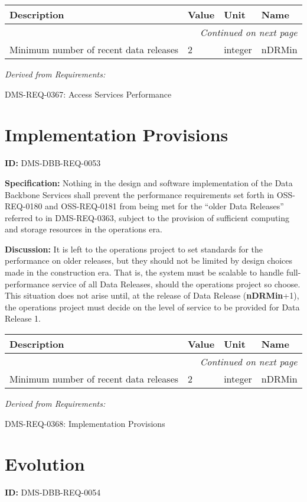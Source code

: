 \documentclass[SE,toc,lsstdraft]{lsstdoc}
\makeatletter
\newcommand{\paramname}[1]{\hspace{0pt}#1}
\newcommand{\unitname}[1]{\hspace{0pt}#1}
\newenvironment{parameters}[0]{%
\setlength\LTleft{0pt}
\setlength\LTright{\fill}
\begin{small}
\begin{longtable}[]{|p{0.49\textwidth}|l|p{0.6in}|p{1.70in}@{}|}

\hline \textbf{Description} & \textbf{Value} & \textbf{Unit} & \textbf{Name} \\ \hline
\endhead

\hline \multicolumn{4}{r}{\emph{Continued on next page}} \\
\endfoot

\hline\hline
\endlastfoot
}{%
\hline
\end{longtable}
\end{small}
}
\makeatother
\begin{document}
\begin{parameters}
Minimum number of recent data releases
&
2
&
\unitname{%
integer
}
&
\paramname{%
nDRMin
} \\\hline
\end{parameters}

\emph{Derived from Requirements:}

DMS-REQ-0367:
Access Services Performance \newline

\section{Implementation Provisions}

\label{DMS-DBB-REQ-0053}
\textbf{ID:} DMS-DBB-REQ-0053

\textbf{Specification:}
Nothing in the design and software implementation of the Data Backbone Services shall prevent the performance requirements set forth in OSS-REQ-0180 and OSS-REQ-0181 from being met for the “older Data Releases” referred to in DMS-REQ-0363, subject to the provision of sufficient computing and storage resources in the operations era.

\textbf{Discussion:}
It is left to the operations project to set standards for the performance on older releases, but they should not be limited by design choices made in the construction era. That is, the system must be scalable to handle full-performance service of all Data Releases, should the operations project so choose. This situation does not arise until, at the release of Data Release (\textbf{nDRMin}+1), the operations project must decide on the level of service to be provided for Data Release 1.

\begin{parameters}
Minimum number of recent data releases
&
2
&
\unitname{%
integer
}
&
\paramname{%
nDRMin
} \\\hline
\end{parameters}

\emph{Derived from Requirements:}

DMS-REQ-0368:
Implementation Provisions \newline

\section{Evolution}

\label{DMS-DBB-REQ-0054}
\textbf{ID:} DMS-DBB-REQ-0054
\end{document}
